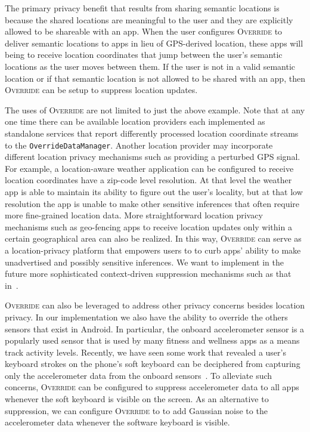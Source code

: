 \documentclass[10pt]{sensys-proc}
\begin{document}
The primary privacy benefit that results from sharing semantic locations is because the shared locations are meaningful to the user and they are explicitly allowed to be shareable with an app. When the user configures \textsc{Override} to deliver semantic locations to apps in lieu of GPS-derived location, these apps will being to receive location coordinates that jump between the user's semantic locations as the user moves between them. If the user is not in a valid semantic location or if that semantic location is not allowed to be shared with an app, then \textsc{Override} can be setup to suppress location updates.

The uses of \textsc{Override} are not limited to just the above example. Note that at any one time there can be available location providers each implemented as standalone services that report differently processed location coordinate streams to the \texttt{OverrideDataManager}. Another location provider may incorporate different location privacy mechanisms such as providing a perturbed GPS signal. For example, a location-aware weather application can be configured to receive location coordinates have a zip-code level resolution. At that level the weather app is able to maintain its ability to figure out the user's locality, but at that low resolution the app is unable to make other sensitive inferences that often require more fine-grained location data. More straightforward location privacy mechanisms such as geo-fencing apps to receive location updates only within a certain geographical area can also be realized. In this way, \textsc{Override} can serve as a location-privacy platform that empowers users to to curb apps' ability to make unadvertised and possibly sensitive inferences. We want to implement in the future more sophisticated context-driven suppression mechanisms such as that in~\cite{Gotz:MaskIt}.

\textsc{Override} can also be leveraged to address other privacy concerns besides location privacy. In our implementation we also have the ability to override the others sensors that exist in Android. In particular, the onboard accelerometer sensor is a popularly used sensor that is used by many fitness and wellness apps as a means track activity levels. Recently, we have seen some work that revealed a user's keyboard strokes on the phone's soft keyboard can be deciphered from capturing only the accelerometer data from the onboard sensors~\cite{}. To alleviate such concerns, \textsc{Override} can be configured to suppress accelerometer data to all apps whenever the soft keyboard is visible on the screen. As an alternative to suppression, we can configure \textsc{Override} to to add Gaussian noise to the accelerometer data whenever the software keyboard is visible.
\end{document}
